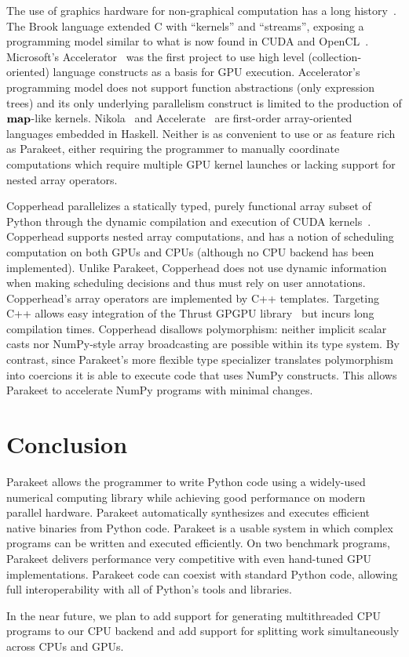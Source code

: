 \documentclass[10pt,twocolumn]{article}
\begin{document}
The use of graphics hardware for non-graphical computation has a long history~\cite{Leng90}. The Brook language extended C with ``kernels'' and ``streams'', exposing a programming model similar to what is now found in CUDA and OpenCL~\cite{Buck04}.  Microsoft's Accelerator~\cite{Tard06} was the first project to use high level (collection-oriented) language constructs as a basis for GPU execution. Accelerator's programming model does not support function abstractions (only expression trees) and its only underlying parallelism construct is limited to the production of $\mbox{\textbf{map}}$-like kernels.  Nikola~\cite{Main10} and Accelerate~\cite{Chak11} are first-order array-oriented languages embedded in Haskell. Neither is as convenient to use or as feature rich as Parakeet, either requiring the programmer to manually coordinate computations which require multiple GPU kernel launches or lacking support for nested array operators.

Copperhead parallelizes a statically typed, purely functional array subset of Python through the dynamic compilation and execution of CUDA kernels~\cite{Cata11}. Copperhead supports nested array computations, and has a notion of scheduling computation on both GPUs and CPUs (although no CPU backend has been implemented). Unlike Parakeet, Copperhead does not use dynamic information when making scheduling decisions and thus must rely on user annotations. Copperhead's array operators are implemented by C++ templates. Targeting C++ allows easy integration of the Thrust GPGPU library~\cite{Hobe10} but incurs long compilation times. Copperhead disallows polymorphism: neither implicit scalar casts nor NumPy-style array broadcasting are possible within its type system. By contrast, since Parakeet's more flexible type specializer translates polymorphism into coercions it is able to execute code that uses NumPy constructs. This allows Parakeet to accelerate NumPy programs with minimal changes.

\section{Conclusion}
\label{Conclusion}
Parakeet allows the programmer to write Python code using a widely-used numerical computing library while achieving good performance on modern parallel hardware. Parakeet automatically synthesizes and executes efficient native binaries from Python code. Parakeet is a usable system in which complex programs can be written and executed efficiently.  On two benchmark programs, Parakeet delivers performance very competitive with even hand-tuned GPU implementations.  Parakeet code can coexist with standard Python code, allowing full interoperability with all of Python's tools and libraries.

In the near future, we plan to add support for generating multithreaded CPU programs to our CPU backend and add support for splitting work simultaneously across CPUs and GPUs.

{\small

{}
}
\end{document}
